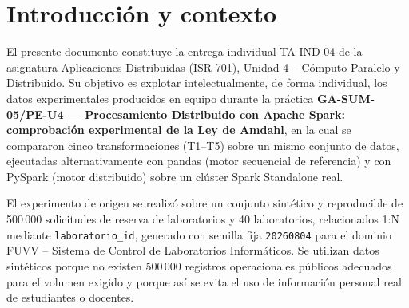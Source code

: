 \documentclass[10pt,conference]{IEEEtran}
\begin{document}
\maketitle

\begin{abstract}
Este informe analiza de forma individual los resultados de \textit{speedup} obtenidos en la práctica grupal GA-SUM-05/PE-U4 --- \textit{Procesamiento Distribuido con Apache Spark} --- para la transformación T5 (ordenamiento global y selección de las 20 solicitudes de mayor demanda) sobre un conjunto sintético de 500\,000 solicitudes de reserva de laboratorios, ejecutada en pandas y en PySpark 3.5.0 sobre un clúster Spark Standalone real de hasta cuatro \textit{executors}. A diferencia de otras transformaciones del equipo, T5 cuenta con mediciones propias de escalado en $N=1,2,4$ \textit{executors}, lo que permite un análisis cuantitativo completo frente a la Ley de Amdahl y la métrica de Karp-Flatt. Se determina que, a diferencia de las transformaciones más ligeras del \textit{pipeline}, el umbral de rentabilidad de T5 ya se cruza al volumen actual, y se propone un punto concreto de integración de un servicio de generación de rankings en la arquitectura de microservicios del Sistema de Control de Laboratorios Informáticos (SCLI).
\end{abstract}

\section{Introducción y contexto}
\label{sec:intro}

El presente documento constituye la entrega individual TA-IND-04 de la asignatura Aplicaciones Distribuidas (ISR-701), Unidad 4 -- Cómputo Paralelo y Distribuido. Su objetivo es explotar intelectualmente, de forma individual, los datos experimentales producidos en equipo durante la práctica \textbf{GA-SUM-05/PE-U4 --- Procesamiento Distribuido con Apache Spark: comprobación experimental de la Ley de Amdahl}, en la cual se compararon cinco transformaciones (T1--T5) sobre un mismo conjunto de datos, ejecutadas alternativamente con pandas (motor secuencial de referencia) y con PySpark (motor distribuido) sobre un clúster Spark Standalone real.

El experimento de origen se realizó sobre un conjunto sintético y reproducible de 500\,000 solicitudes de reserva de laboratorios y 40 laboratorios, relacionados 1:N mediante \texttt{laboratorio\_id}, generado con semilla fija \texttt{20260804} para el dominio FUVV -- Sistema de Control de Laboratorios Informáticos. Se utilizan datos sintéticos porque no existen 500\,000 registros operacionales públicos adecuados para el volumen exigido y porque así se evita el uso de información personal real de estudiantes o docentes.
\end{document}
